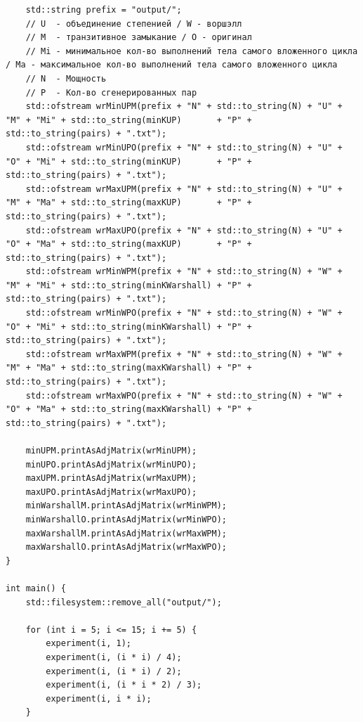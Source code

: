 \documentclass[a4paper,14pt]{extarticle}
\begin{document}
\begin{enumerate}[1.]
\begin{verbatim}
    std::string prefix = "output/";
    // U  - объединение степенией / W - воршэлл
    // M  - транзитивное замыкание / O - оригинал
    // Mi - минимальное кол-во выполнений тела самого вложенного цикла / Ma - максимальное кол-во выполнений тела самого вложенного цикла
    // N  - Мощность
    // P  - Кол-во сгенерированных пар 
    std::ofstream wrMinUPM(prefix + "N" + std::to_string(N) + "U" + "M" + "Mi" + std::to_string(minKUP)       + "P" + std::to_string(pairs) + ".txt");
    std::ofstream wrMinUPO(prefix + "N" + std::to_string(N) + "U" + "O" + "Mi" + std::to_string(minKUP)       + "P" + std::to_string(pairs) + ".txt");
    std::ofstream wrMaxUPM(prefix + "N" + std::to_string(N) + "U" + "M" + "Ma" + std::to_string(maxKUP)       + "P" + std::to_string(pairs) + ".txt");
    std::ofstream wrMaxUPO(prefix + "N" + std::to_string(N) + "U" + "O" + "Ma" + std::to_string(maxKUP)       + "P" + std::to_string(pairs) + ".txt");
    std::ofstream wrMinWPM(prefix + "N" + std::to_string(N) + "W" + "M" + "Mi" + std::to_string(minKWarshall) + "P" + std::to_string(pairs) + ".txt");
    std::ofstream wrMinWPO(prefix + "N" + std::to_string(N) + "W" + "O" + "Mi" + std::to_string(minKWarshall) + "P" + std::to_string(pairs) + ".txt");
    std::ofstream wrMaxWPM(prefix + "N" + std::to_string(N) + "W" + "M" + "Ma" + std::to_string(maxKWarshall) + "P" + std::to_string(pairs) + ".txt");
    std::ofstream wrMaxWPO(prefix + "N" + std::to_string(N) + "W" + "O" + "Ma" + std::to_string(maxKWarshall) + "P" + std::to_string(pairs) + ".txt");
    
    minUPM.printAsAdjMatrix(wrMinUPM);
    minUPO.printAsAdjMatrix(wrMinUPO);
    maxUPM.printAsAdjMatrix(wrMaxUPM);
    maxUPO.printAsAdjMatrix(wrMaxUPO);
    minWarshallM.printAsAdjMatrix(wrMinWPM);
    minWarshallO.printAsAdjMatrix(wrMinWPO);
    maxWarshallM.printAsAdjMatrix(wrMaxWPM);
    maxWarshallO.printAsAdjMatrix(wrMaxWPO);
}

int main() {
    std::filesystem::remove_all("output/");

    for (int i = 5; i <= 15; i += 5) {
        experiment(i, 1);
        experiment(i, (i * i) / 4);
        experiment(i, (i * i) / 2);
        experiment(i, (i * i * 2) / 3);
        experiment(i, i * i);
    }


\end{verbatim}
\end{enumerate}
\end{document}
